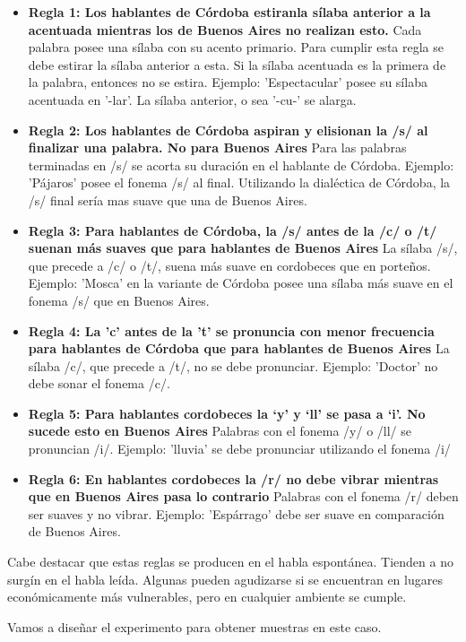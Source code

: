 \begin{itemize}

\item \textbf{Regla 1: Los hablantes de Córdoba estiranla sílaba anterior a la acentuada mientras los de Buenos Aires no realizan esto.} Cada palabra posee una sílaba con su acento primario. Para cumplir esta regla se debe estirar la sílaba anterior a esta. Si la sílaba acentuada es la primera de la palabra, entonces no se estira. Ejemplo: 'Espectacular' posee su sílaba acentuada en '-lar'. La sílaba anterior, o sea '-cu-' se alarga. 

\item \textbf{Regla 2: Los hablantes de Córdoba aspiran y elisionan la /s/ al finalizar una palabra. No para Buenos Aires} Para las palabras terminadas en /s/ se acorta su duración en el hablante de Córdoba. Ejemplo: 'Pájaros' posee el fonema /s/ al final. Utilizando la dialéctica de Córdoba, la /s/ final sería mas suave que una de Buenos Aires. 

\item \textbf{Regla 3: Para hablantes de Córdoba, la /s/ antes de la /c/ o /t/ suenan más suaves que para hablantes de Buenos Aires } La sílaba /s/, que precede a /c/ o /t/, suena más suave en cordobeces que en porteños. Ejemplo: 'Mosca' en la variante de Córdoba posee una sílaba más suave en el fonema /s/ que en Buenos Aires. 

\item \textbf{Regla 4: La 'c' antes de la 't' se pronuncia con menor frecuencia para hablantes de Córdoba que para hablantes de Buenos Aires} La sílaba /c/, que precede a /t/, no se debe pronunciar. Ejemplo: 'Doctor' no debe sonar el fonema /c/.

\item \textbf{Regla 5: Para hablantes cordobeces la ‘y’ y ‘ll’ se pasa a ‘i’. No sucede esto en Buenos Aires} Palabras con el fonema /y/ o /ll/ se pronuncian /i/. Ejemplo: 'lluvia' se debe pronunciar utilizando el fonema /i/ 

\item \textbf{Regla 6: En hablantes cordobeces la /r/ no debe vibrar mientras que en Buenos Aires pasa lo contrario} Palabras con el fonema /r/ deben ser suaves y no vibrar. Ejemplo: 'Espárrago' debe ser suave en comparación de Buenos Aires. 

\end{itemize}

Cabe destacar que estas reglas se producen en el habla espontánea. Tienden a no surgín en el habla leída. Algunas pueden agudizarse si se encuentran en lugares económicamente más vulnerables, pero en cualquier ambiente se cumple.

Vamos a diseñar el experimento para obtener muestras en este caso.
